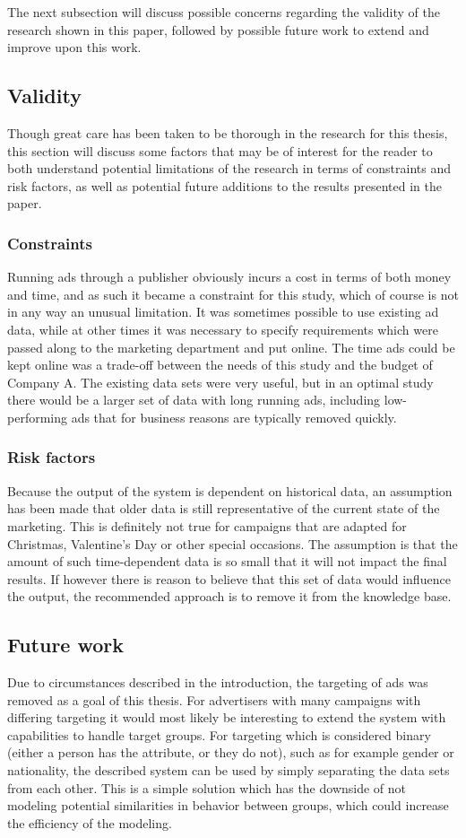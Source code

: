 \documentclass{sig-alternate}
\begin{document}
The next subsection will discuss possible concerns regarding the validity of the research shown in this paper, followed by possible future work to extend and improve upon this work.

\subsection{Validity}
Though great care has been taken to be thorough in the research for this thesis, this section will discuss some factors that may be of interest for the reader to both understand potential limitations of the research in terms of constraints and risk factors, as well as potential future additions to the results presented in the paper.

\subsubsection{Constraints}
Running ads through a publisher obviously incurs a cost in terms of both money and time, and as such it became a constraint for this study, which of course is not in any way an unusual limitation. It was sometimes possible to use existing ad data, while at other times it was necessary to specify requirements which were passed along to the marketing department and put online. The time ads could be kept online was a trade-off between the needs of this study and the budget of Company A. The existing data sets were very useful, but in an optimal study there would be a larger set of data with long running ads, including low-performing ads that for business reasons are typically removed quickly.

\subsubsection{Risk factors}
Because the output of the system is dependent on historical data, an assumption has been made that older data is still representative of the current state of the marketing. This is definitely not true for campaigns that are adapted for Christmas, Valentine's Day or other special occasions. The assumption is that the amount of such time-dependent data is so small that it will not impact the final results. If however there is reason to believe that this set of data would influence the output, the recommended approach is to remove it from the knowledge base.

\subsection{Future work}
Due to circumstances described in the introduction, the targeting of ads was removed as a goal of this thesis. For advertisers with many campaigns with differing targeting it would most likely be interesting to extend the system with capabilities to handle target groups. For targeting which is considered binary (either a person has the attribute, or they do not), such as for example gender or nationality, the described system can be used by simply separating the data sets from each other. This is a simple solution which has the downside of not modeling potential similarities in behavior between groups, which could increase the efficiency of the modeling.
\end{document}
